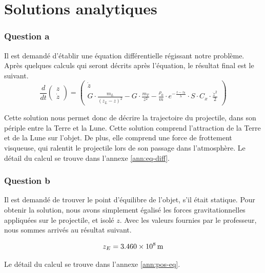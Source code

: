 \documentclass[a4paper,12pt,twoside]{article}
\begin{document}
\section{Solutions analytiques}
\subsubsection*{Question a}
Il est demandé d'établir une équation différentielle régissant notre problème.
Après quelques calculs qui seront décrits après l'équation, le résultat final est le suivant.
\begin{equation}
    \frac{d}{dt}
    \begin{pmatrix}
        z \\
        \dot{z}
    \end{pmatrix}
    =
    \begin{pmatrix}
    \dot{z} \\
    G\cdot\frac{m_L}{(z_L - z)^2} - G\cdot\frac{m_T}{z^2} - \frac{\rho_0}{m}\cdot e^{-\frac{z-z_0}{\lambda}}\cdot S\cdot C_x\cdot \frac{\dot{z}^2}{2}
    \end{pmatrix}
    \label{eq:sol}
\end{equation}

Cette solution nous permet donc de décrire la trajectoire du projectile, dans son périple entre la Terre et la Lune.
Cette solution comprend l'attraction de la Terre et de la Lune sur l'objet.
De plus, elle comprend une force de frottement visqueuse, qui ralentit le projectile lors de son passage dans l'atmosphère.
Le détail du calcul se trouve dans l'annexe \ref{ann:eq-diff}.\\

\subsubsection*{Question b}
Il est demandé de trouver le point d'équilibre de l'objet, s'il était statique.
Pour obtenir la solution, nous avons simplement égalisé les forces gravitationnelles appliquées sur le projectile, et isolé $z$.
Avec les valeurs fournies par le professeur, nous sommes arrivés au résultat suivant.

\begin{equation}
    z_E = \SI{3.460d8}{\meter}
    \label{val:zE}
\end{equation}

Le détail du calcul se trouve dans l'annexe \ref{ann:pos-eq}.\\
\end{document}
